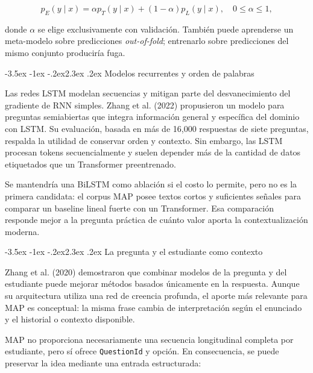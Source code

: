 \documentclass[11pt,oneside,openany]{book}
\makeatletter
\renewcommand\section{\@startsection{section}{1}{\z@}%
  {-3.5ex \@plus -1ex \@minus -.2ex}{2.3ex \@plus .2ex}%
  {\normalfont\Large\sffamily\bfseries\color{AzulMedio}}}
\newcommand{\codigo}[1]{\texttt{#1}}
\makeatother
\begin{document}
\[
p_E(y\mid x)=\alpha p_T(y\mid x)+(1-\alpha)p_L(y\mid x),
\quad 0\leq\alpha\leq1,
\]

donde $\alpha$ se elige exclusivamente con validación. También puede aprenderse un
meta-modelo sobre predicciones \emph{out-of-fold}; entrenarlo sobre predicciones
del mismo conjunto produciría fuga.

\section{Modelos recurrentes y orden de palabras}

Las redes LSTM modelan secuencias y mitigan parte del desvanecimiento del gradiente
de RNN simples. Zhang et al. (2022) propusieron un modelo para preguntas
semiabiertas que integra información general y específica del dominio con LSTM.
Su evaluación, basada en más de 16,000 respuestas de siete preguntas, respalda la
utilidad de conservar orden y contexto. Sin embargo, las LSTM procesan tokens
secuencialmente y suelen depender más de la cantidad de datos etiquetados que un
Transformer preentrenado.

Se mantendría una BiLSTM como ablación si el costo lo permite, pero no es la
primera candidata: el corpus MAP posee textos cortos y suficientes señales para
comparar un baseline lineal fuerte con un Transformer. Esa comparación responde
mejor a la pregunta práctica de cuánto valor aporta la contextualización moderna.

\section{La pregunta y el estudiante como contexto}

Zhang et al. (2020) demostraron que combinar modelos de la pregunta y del
estudiante puede mejorar métodos basados únicamente en la respuesta. Aunque su
arquitectura utiliza una red de creencia profunda, el aporte más relevante para
MAP es conceptual: la misma frase cambia de interpretación según el enunciado y el
historial o contexto disponible.

MAP no proporciona necesariamente una secuencia longitudinal completa por
estudiante, pero sí ofrece \codigo{QuestionId} y opción. En consecuencia, se puede
preservar la idea mediante una entrada estructurada:

\begin{center}
\end{center}
\end{document}
